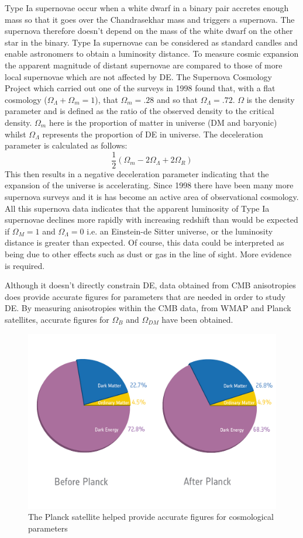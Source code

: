 \documentclass[a4paper,12pt]{article}
\begin{document}
Type Ia supernovae occur when a white dwarf in a binary pair accretes enough mass so that it goes over the Chandrasekhar mass and triggers a supernova. The supernova therefore doesn't
depend on the mass of the white dwarf on the other star in the binary. Type Ia supernovae can be considered as standard candles and enable astronomers to obtain a luminosity distance.
To measure cosmic expansion the apparent magnitude of distant supernovae are compared to those of more local supernovae which are not affected by DE. The Supernova Cosmology Project
which carried out one of the surveys in 1998 found that, with a flat cosmology ($\Omega_{\Lambda}+\Omega_m=1$), that $\Omega_m=.28$ and so that $\Omega_{\Lambda}=.72$. $\Omega$ is the
density parameter and is defined as the ratio of the observed density to the critical density. $\Omega_m$ here is 
the proportion of matter in universe (DM and baryonic) whilst $\Omega_{\Lambda}$ represents the proportion of DE in universe. The deceleration parameter is calculated as follows:
\begin{equation}
\frac{1}{2}(\Omega_m-2\Omega_{\Lambda}+2\Omega_R) 
\end{equation}
This then results in a negative deceleration parameter indicating that the expansion of the universe is accelerating.
Since 1998 there have been many more supernova surveys and it is has become an active area of observational cosmology. All this supernova data indicates that the apparent luminosity
of Type Ia supernovae declines more rapidly with increasing redshift than would be expected if $\Omega_M=1$ and $\Omega_{\Lambda}=0$ i.e. an Einstein-de Sitter universe, or the 
luminosity distance is greater than expected. Of course, this data could be interpreted as being due to other effects such as dust or gas in the line of sight. More evidence is required.

Although it doesn't directly constrain DE, data obtained from CMB anisotropies does provide accurate figures for parameters that are needed in order to study DE. By measuring anisotropies 
within the CMB data, from WMAP and Planck satellites, accurate figures for $\Omega_B$ and $\Omega_{DM}$ have been obtained. 
\begin{figure}[H]
\centering
\includegraphics[width=.9\textwidth]{./planck2.jpg}
\caption{The Planck satellite helped provide accurate figures for cosmological parameters \citep{planck}}
\label{fig:3}
\end{figure}
\end{document}
